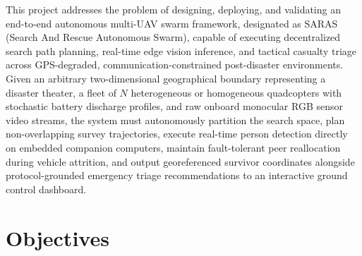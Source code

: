 This project addresses the problem of designing, deploying, and validating an end-to-end autonomous multi-UAV swarm framework, designated as SARAS (Search And Rescue Autonomous Swarm), capable of executing decentralized search path planning, real-time edge vision inference, and tactical casualty triage across GPS-degraded, communication-constrained post-disaster environments. Given an arbitrary two-dimensional geographical boundary representing a disaster theater, a fleet of $N$ heterogeneous or homogeneous quadcopters with stochastic battery discharge profiles, and raw onboard monocular RGB sensor video streams, the system must autonomously partition the search space, plan non-overlapping survey trajectories, execute real-time person detection directly on embedded companion computers, maintain fault-tolerant peer reallocation during vehicle attrition, and output georeferenced survivor coordinates alongside protocol-grounded emergency triage recommendations to an interactive ground control dashboard.

\section{Objectives}

